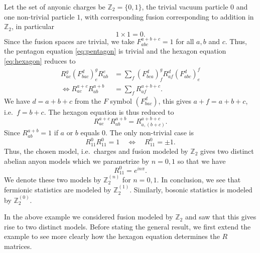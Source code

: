 \begin{example}[$\mathbb{Z}_2^{(n)}$]
  Let the set of anyonic charges be $\mathbb{Z}_2 = \{0, 1\}$, the trivial vacuum particle $0$ and one non-trivial particle $1$, with corresponding fusion corresponding to addition in $\mathbb{Z}_2$, in particular
  \begin{equation}
    1 × 1 = 0.
  \end{equation}
  Since the fusion spaces are trivial, we take $F_{abc}^{a+b+c} = 1$ for all $a, b$ and $c$. Thus, the pentagon equation \cref{eq:pentagon} is trivial and the hexagon equation \cref{eq:hexagon} reduces to
  \begin{equation}
    \begin{aligned}
      R_{ac}^g \left(F_{bac}^d\right)^g_e R_{ab}^e &= \sum_{f} \left(F_{bca}^d\right)^g_f R_{af}^d \left(F_{abc}^d\right)^f_e \\
      \iff
      R_{ac}^{a+c} R_{ab}^{a+b} &= \sum_{f} R_{af}^{a+b+c}.
    \end{aligned}
  \end{equation}
  We have $d = a + b + c$ from the $F$ symbol $\left(F_{bac}^d\right)$, this gives $a + f = a + b + c$, i.e.\ $f = b + c$. The hexagon equation is thus reduced to
  \begin{equation}
    R_{ac}^{a+c} R_{ab}^{a+b} = R_{a,(b+c)}^{a+b+c}.
  \end{equation}
  Since $R_{ab}^{a+b} = 1$ if $a$ or $b$ equals $0$. The only non-trivial case is
  \begin{equation}
    R_{11}^{0} R_{11}^{0} = 1 \quad \iff \quad R_{11}^{0} = ±1.
  \end{equation}
  Thus, the chosen model, i.e.\ charges and fusion modeled by $\mathbb{Z}_2$ gives two distinct abelian anyon models which we parametrize by $n = 0, 1$ so that we have
  \begin{equation}
    R_{11}^0 = e^{inπ}.
  \end{equation}
  We denote these two models by $\mathbb{Z}_2^{(n)}$ for $n = 0, 1$. In conclusion, we see that fermionic statistics are modeled by $\mathbb{Z}_2^{(1)}$. Similarly, bosonic statistics is modeled by $\mathbb{Z}_2^{(0)}$.
\end{example}

In the above example we considered fusion modeled by $\mathbb{Z}_2$ and saw that this gives rise to two distinct models. Before stating the general result, we first extend the example to see more clearly how the hexagon equation determines the $R$ matrices.

